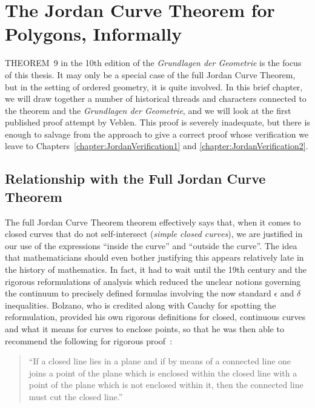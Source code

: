 \chapter{The Jordan Curve Theorem for Polygons, Informally}\label{chapter:JordanInformal}
THEOREM~9 in the 10th edition of the \emph{Grundlagen der Geometrie} is the focus of this thesis. It may only be a special case of the full Jordan Curve Theorem, but in the setting of ordered geometry, it is quite involved. In this brief chapter, we will draw together a number of historical threads and characters connected to the theorem and the \emph{Grundlagen der Geometrie}, and we will look at the first published proof attempt by Veblen. This proof is severely inadequate, but there is enough to salvage from the approach to give a correct proof whose verification we leave to Chapters~\ref{chapter:JordanVerification1} and \ref{chapter:JordanVerification2}.

\section{Relationship with the Full Jordan Curve Theorem}\label{sec:JordanCurveHistory}
The full Jordan Curve Theorem theorem effectively says that, when it comes to closed curves that do not self-intersect (\emph{simple closed curves}), we are justified in our use of the expressions ``inside the curve'' and ``outside the curve''. The idea that mathematicians should even bother justifying this appears relatively late in the history of mathematics. In fact, it had to wait until the 19th century and the rigorous reformulations of analysis which reduced the unclear notions governing the continuum to precisely defined formulas involving the now standard $\epsilon$ and $\delta$ inequalities. Bolzano, who is credited along with Cauchy for spotting the reformulation, provided his own rigorous definitions for closed, continuous curves and what it means for curves to enclose points, so that he was then able to recommend the following for rigorous proof~\cite{BolzanoJordan}:

\begin{quote}
``If a closed line lies in a plane and if by means of a connected line one joins a point of the plane which is enclosed within the closed line with a point of the plane which is not enclosed within it, then the connected line must cut the closed line.''
\end{quote}

